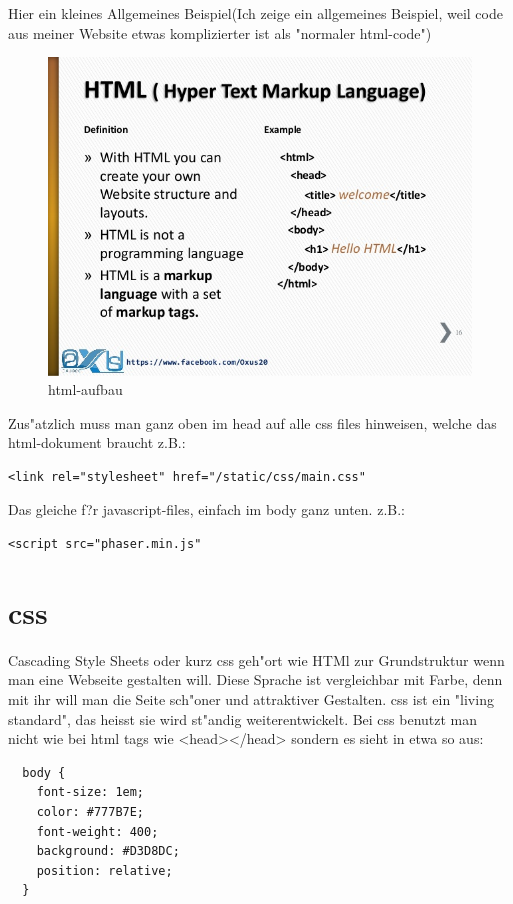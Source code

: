 \documentclass{article}
\begin{document}
Hier ein kleines Allgemeines Beispiel(Ich zeige ein allgemeines Beispiel, weil code aus meiner Website etwas komplizierter ist als "normaler html-code")

\begin{figure}[ht]
    \centering
    \includegraphics[width=.7\linewidth]{html-wissen}
    \caption{html-aufbau}
    \label{fig:sub1}
    \end{figure}
Zus"atzlich muss man ganz oben im head auf alle css files hinweisen, welche das html-dokument braucht z.B.:

\begin{lstlisting}
<link rel="stylesheet" href="/static/css/main.css"
\end{lstlisting}

Das gleiche f?r javascript-files, einfach im body ganz unten. z.B.:

\begin{lstlisting}
<script src="phaser.min.js"
\end{lstlisting}








\cleardoublepage


\section{css}
Cascading Style Sheets oder kurz css geh"ort wie HTMl zur Grundstruktur wenn man eine Webseite gestalten will.
Diese Sprache ist vergleichbar mit Farbe, denn mit ihr will man die Seite sch"oner und attraktiver Gestalten.
css ist ein "living standard", das heisst sie wird st"andig weiterentwickelt.
Bei css benutzt man nicht wie bei html tags wie <head></head> sondern es sieht in etwa so aus:\\
\begin{lstlisting}
  body {
    font-size: 1em;
    color: #777B7E;
    font-weight: 400;
    background: #D3D8DC;
    position: relative;
  }
\end{lstlisting}
\end{document}
